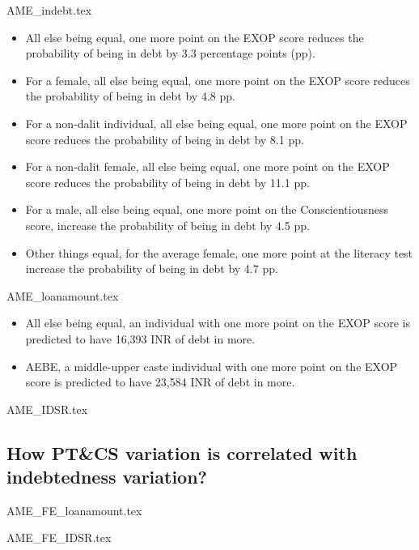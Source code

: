 \documentclass[a4paper, 11pt, onecolumn]{article}
\begin{document}
{AME_indebt.tex}

\begin{itemize}
\item All else being equal, one more point on the EXOP score reduces the probability of being in debt by 3.3 percentage points (pp).
\item For a female, all else being equal, one more point on the EXOP score reduces the probability of being in debt by 4.8 pp.
\item For a non-dalit individual, all else being equal, one more point on the EXOP score reduces the probability of being in debt by 8.1 pp.
\item For a non-dalit female, all else being equal, one more point on the EXOP score reduces the probability of being in debt by 11.1 pp.
\item For a male, all else being equal, one more point on the Conscientiousness score, increase the probability of being in debt by 4.5 pp.

\item Other things equal, for the average female, one more point at the literacy test increase the probability of being in debt by 4.7 pp.
\end{itemize}





{AME_loanamount.tex}

\begin{itemize}
\item All else being equal, an individual with one more point on the EXOP score is predicted to have 16,393 INR of debt in more.
\item AEBE, a middle-upper caste individual with one more point on the EXOP score is predicted to have 23,584 INR of debt in more.
\end{itemize}


{AME_IDSR.tex}






\subsection{How PT\&CS variation is correlated with indebtedness variation?}

{AME_FE_loanamount.tex}

{AME_FE_IDSR.tex}
\end{document}
